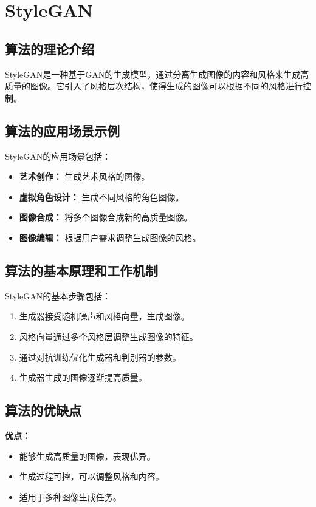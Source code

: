 \section{StyleGAN}
\subsection*{算法的理论介绍}
StyleGAN是一种基于GAN的生成模型，通过分离生成图像的内容和风格来生成高质量的图像。它引入了风格层次结构，使得生成的图像可以根据不同的风格进行控制。

\subsection*{算法的应用场景示例}
StyleGAN的应用场景包括：
\begin{itemize}
    \item \textbf{艺术创作：} 生成艺术风格的图像。
    \item \textbf{虚拟角色设计：} 生成不同风格的角色图像。
    \item \textbf{图像合成：} 将多个图像合成新的高质量图像。
    \item \textbf{图像编辑：} 根据用户需求调整生成图像的风格。
\end{itemize}

\subsection*{算法的基本原理和工作机制}
StyleGAN的基本步骤包括：
\begin{enumerate}
    \item 生成器接受随机噪声和风格向量，生成图像。
    \item 风格向量通过多个风格层调整生成图像的特征。
    \item 通过对抗训练优化生成器和判别器的参数。
    \item 生成器生成的图像逐渐提高质量。
\end{enumerate}

\subsection*{算法的优缺点}
\textbf{优点：}
\begin{itemize}
    \item 能够生成高质量的图像，表现优异。
    \item 生成过程可控，可以调整风格和内容。
    \item 适用于多种图像生成任务。
\end{itemize}

